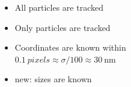 \documentclass{beamer}
\begin{document}
\begin{frame}
\begin{columns}
	\begin{itemize}
		\item All particles are tracked
		\item Only particles are tracked
		\item Coordinates are known within\\
			$\SI{0.1}{pixels} \approx \sigma/100 \approx \SI{30}{\nano\metre}$
		\item \alert{new}: sizes are known
	\end{itemize}
	\end{columns}
\end{frame}
\end{document}

